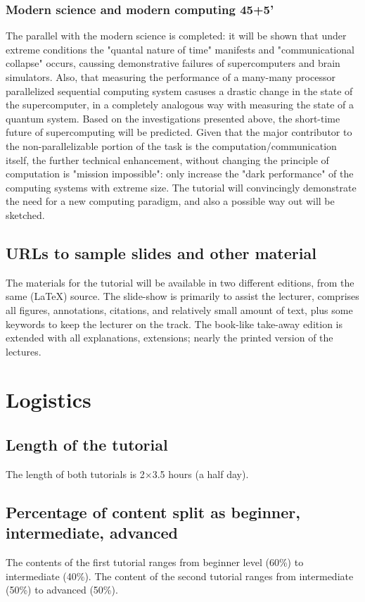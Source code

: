 \documentclass[preprint,12pt,authoryear]{article}
\begin{document}
		
		\subsubsection{Modern science and modern computing 45+5'}
		The parallel with the modern science is completed:
		it will be shown that under extreme conditions the "quantal nature
		of time" manifests and "communicational collapse" occurs,
		caussing demonstrative failures of supercomputers and brain simulators.
		Also, that measuring the performance of a many-many processor
		parallelized sequential computing system casuses a drastic  
		change in the state of the supercomputer, in a completely analogous 
		way with measuring the state of a quantum system.
		Based on the investigations presented above, the short-time 
		future of supercomputing will be predicted. Given that the
		major contributor to the non-parallelizable portion of the task
		is the computation/communication itself, the further technical enhancement, without changing the principle of computation is "mission impossible": only increase the "dark performance" of the computing systems with extreme size. The tutorial will convincingly demonstrate
		the need for a new computing paradigm, and also a possible way out will be sketched. 
	    
	\subsection{URLs to sample slides and other material}
	
	The materials for the tutorial will be available in two different editions,
	from the same (LaTeX) source.
	The slide-show is primarily to assist the lecturer, comprises
	all figures, annotations, citations, and relatively small amount of text, plus some keywords to keep the lecturer on the track.
	The book-like take-away edition is extended with all explanations,
	extensions; nearly the printed version of the lectures.
	
\section{Logistics}
	\subsection{Length of the tutorial}
	The length of both tutorials is 2$\times$3.5 hours (a half day).
	\subsection{Percentage of content split as beginner, intermediate, advanced}
	The contents of the first tutorial ranges from beginner level (60\%) to intermediate (40\%).
	The content of the  second tutorial ranges from intermediate (50\%) to advanced (50\%).
	
\end{document}
